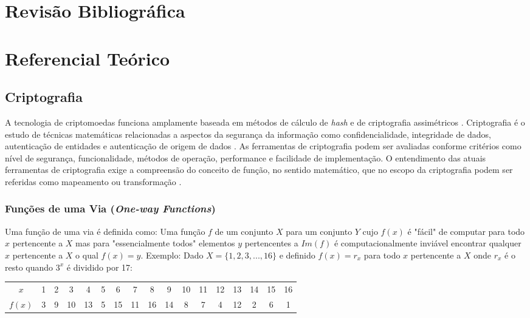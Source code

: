 \documentclass[
	article,			%
	11pt,				%
	oneside,			%
	a4paper,			%
	chapter=TITLE,		%
	section=TITLE,		%
	subsection=TITLE,	%
	subsubsection=TITLE, %
	english,			%
	brazil,				%
	sumario=tradicional
	]{ifrs-artigo-abntex2}
\begin{document}
\section{Revisão Bibliográfica}

\section{Referencial Teórico}

\subsection{Criptografia}
A tecnologia de criptomoedas funciona amplamente baseada em métodos de cálculo de \textit{hash} e de criptografia assimétricos \cite{masterBit}. Criptografia é o estudo de técnicas matemáticas relacionadas a aspectos da segurança da informação como confidencialidade, integridade de dados, autenticação de entidades e autenticação de origem de dados \cite{katz1996handbook}.
As ferramentas de criptografia podem ser avaliadas conforme critérios como nível de segurança, funcionalidade, métodos de operação, performance e facilidade de implementação. O entendimento das atuais ferramentas de criptografia exige  a compreensão do conceito de função, no sentido matemático, que no escopo da criptografia podem ser referidas como mapeamento ou transformação \cite{katz1996handbook}.

\subsubsection{Funções de uma Via (\textit{One-way Functions})}
Uma função  de uma via é definida como: Uma função $f$ de um conjunto $X$ para um conjunto $Y$ cujo $f(x)$ é "fácil" de computar para todo $x$ pertencente a $X$ mas para "essencialmente todos" elementos $y$ pertencentes a $Im(f)$ é computacionalmente inviável encontrar qualquer $x$ pertencente a $X$ o qual $f(x) = y$. Exemplo: Dado $X = \{1,2,3,...,16\}$ e definido $f(x) = r_x$ para todo $x$ pertencente a $X$ onde $r_x$ é o resto quando $3^x$ é dividido por 17:

\begin{table}[htb]
  \begin{center}
    \label{tabela-oneway}
    \begin{tabular}{|c|c|c|c|c|c|c|c|c|c|c|c|c|c|c|c|c|}
      \hline
      $x$ & 1 & 2 & 3 & 4 & 5 & 6 & 7 & 8 & 9 & 10 & 11 & 12 & 13 & 14 & 15 & 16 \\
      $f(x)$ & 3 & 9 & 10 & 13 & 5 & 15 & 11 & 16 & 14 & 8 & 7 & 4 & 12 & 2 & 6 & 1 \\
      \hline
    \end{tabular}
  \end{center}
\end{table}
\end{document}
